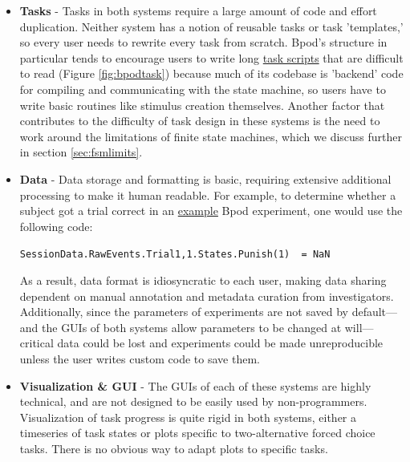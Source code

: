 \documentclass[nohyper, justified, notitlepage, marginals=raggedright,twoside=false,debug]{tufte-autopilot}
\begin{document}
\begin{itemize}[resume*, before=\vspace{0pt}, after=\vspace{\baselineskip}]%
    \item \textbf{Tasks} - Tasks in both systems require a large amount of code and effort duplication. Neither system has a notion of reusable tasks or task 'templates,' so every user needs to rewrite every task from scratch. Bpod's structure in particular tends to encourage users to write long \href{https://github.com/sanworks/Bpod_Gen2/blob/master/Examples/Protocols/AnalogSound2AFC/AnalogSound2AFC.m}{task scripts} that are difficult to read (Figure \ref{fig:bpodtask}) because much of its codebase is 'backend' code for compiling and communicating with the state machine, so users have to write basic routines like stimulus creation themselves. Another factor that contributes to the difficulty of task design in these systems is the need to work around the limitations of finite state machines, which we discuss further in section \ref{sec:fsmlimits}.
    \item \textbf{Data} - Data storage and formatting is basic, requiring extensive additional processing to make it human readable. For example, to determine whether a subject got a trial correct in an \href{https://github.com/sanworks/Bpod_Gen2/blob/master/Examples/Protocols/Light/Light2AFC/Light2AFC.m}{example} Bpod experiment, one would use the following code:
    
    \texttt{SessionData.RawEvents.Trial{1,1}.States.Punish(1) ~= NaN}
    
    As a result, data format is idiosyncratic to each user, making data sharing dependent on manual annotation and metadata curation from investigators. Additionally, since the parameters of experiments are not saved by default---and the GUIs of both systems allow parameters to be changed at will---critical data could be lost and experiments could be made unreproducible unless the user writes custom code to save them.
    \clearpage
    \item \textbf{Visualization \& GUI} - The GUIs of each of these systems are highly technical, and are not designed to be easily used by non-programmers. Visualization of task progress is quite rigid in both systems, either a timeseries of task states or plots specific to two-alternative forced choice tasks. There is no obvious way to adapt plots to specific tasks.
\end{itemize}
\end{document}
